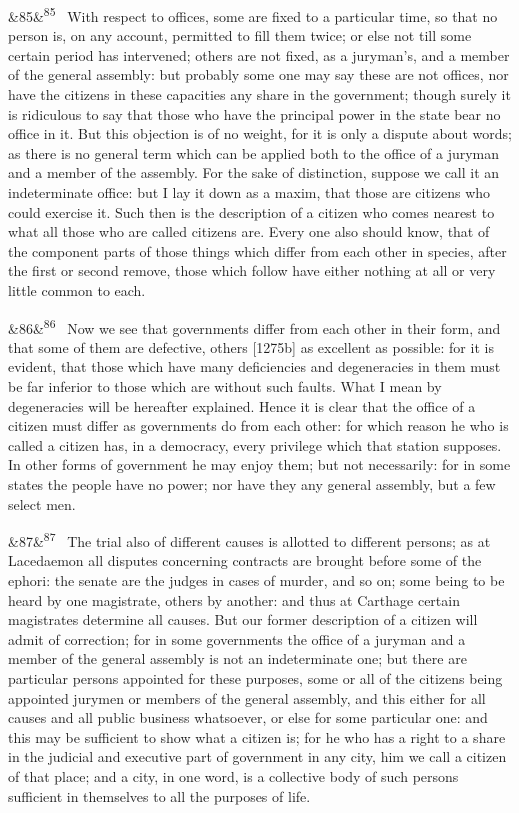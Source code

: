 \documentclass[12pt]{article}
\newcommand{\para}[1][]{\par\noindent\ifx&#1&\else\textsuperscript{\footnotesize #1}~\fi}
\begin{document}
\para[85] With respect to offices, some are fixed to a particular time, so that no person is, on any account, permitted to fill them twice; or else not till some certain period has intervened; others are not fixed, as a juryman's, and a member of the general assembly: but probably some one may say these are not offices, nor have the citizens in these capacities any share in the government; though surely it is ridiculous to say that those who have the principal power in the state bear no office in it. But this objection is of no weight, for it is only a dispute about words; as there is no general term which can be applied both to the office of a juryman and a member of the assembly. For the sake of distinction, suppose we call it an indeterminate office: but I lay it down as a maxim, that those are citizens who could exercise it. Such then is the description of a citizen who comes nearest to what all those who are called citizens are. Every one also should know, that of the component parts of those things which differ from each other in species, after the first or second remove, those which follow have either nothing at all or very little common to each.

\para[86] Now we see that governments differ from each other in their form, and that some of them are defective, others [1275b] as excellent as possible: for it is evident, that those which have many deficiencies and degeneracies in them must be far inferior to those which are without such faults. What I mean by degeneracies will be hereafter explained. Hence it is clear that the office of a citizen must differ as governments do from each other: for which reason he who is called a citizen has, in a democracy, every privilege which that station supposes. In other forms of government he may enjoy them; but not necessarily: for in some states the people have no power; nor have they any general assembly, but a few select men.

\para[87] The trial also of different causes is allotted to different persons; as at Lacedaemon all disputes concerning contracts are brought before some of the ephori: the senate are the judges in cases of murder, and so on; some being to be heard by one magistrate, others by another: and thus at Carthage certain magistrates determine all causes. But our former description of a citizen will admit of correction; for in some governments the office of a juryman and a member of the general assembly is not an indeterminate one; but there are particular persons appointed for these purposes, some or all of the citizens being appointed jurymen or members of the general assembly, and this either for all causes and all public business whatsoever, or else for some particular one: and this may be sufficient to show what a citizen is; for he who has a right to a share in the judicial and executive part of government in any city, him we call a citizen of that place; and a city, in one word, is a collective body of such persons sufficient in themselves to all the purposes of life.
\end{document}
